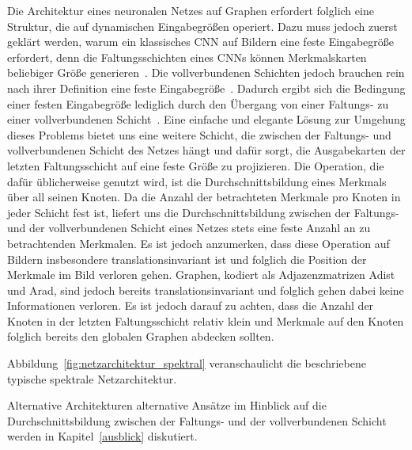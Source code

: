 Die Architektur eines neuronalen Netzes auf Graphen erfordert folglich eine Struktur, die auf dynamischen Eingabegrößen operiert.
Dazu muss jedoch zuerst geklärt werden, warum ein klassisches \gls{CNN} auf Bildern eine feste Eingabegröße erfordert, denn die Faltungsschichten eines \glspl{CNN} können Merkmalskarten beliebiger Größe generieren~\cite{spp}.
Die vollverbundenen Schichten jedoch brauchen rein nach ihrer Definition eine feste Eingabegröße~\cite{spp}.
Dadurch ergibt sich die Bedingung einer festen Eingabegröße lediglich durch den Übergang von einer Faltungs- zu einer vollverbundenen Schicht~\cite{spp}.
Eine einfache und elegante Lösung zur Umgehung dieses Problems bietet uns eine weitere Schicht, die zwischen der Faltungs- und vollverbundenen Schicht des Netzes hängt und dafür sorgt, die Ausgabekarten der letzten Faltungsschicht auf eine feste Größe zu projizieren.
Die Operation, die dafür üblicherweise genutzt wird, ist die Durchschnittsbildung eines Merkmals über all seinen Knoten.
Da die Anzahl der betrachteten Merkmale pro Knoten in jeder Schicht fest ist, liefert uns die Durchschnittsbildung zwischen der Faltungs- und der vollverbundenen Schicht eines Netzes stets eine feste Anzahl an zu betrachtenden Merkmalen.
Es ist jedoch anzumerken, dass diese Operation auf Bildern insbesondere translationsinvariant ist und folglich die Position der Merkmale im Bild verloren gehen.
Graphen, kodiert als Adjazenzmatrizen \gls{Adist} und \gls{Arad}, sind jedoch bereits translationsinvariant und folglich gehen dabei keine Informationen verloren.
Es ist jedoch darauf zu achten, dass die Anzahl der Knoten in der letzten Faltungsschicht relativ klein und Merkmale auf den Knoten folglich bereits den globalen Graphen abdecken sollten.

Abbildung~\ref{fig:netzarchitektur_spektral} veranschaulicht die beschriebene typische spektrale Netzarchitektur.

Alternative Architekturen \bzw{} alternative Ansätze im Hinblick auf die Durchschnittsbildung zwischen der Faltungs- und der vollverbundenen Schicht werden in Kapitel~\ref{ausblick} diskutiert.

